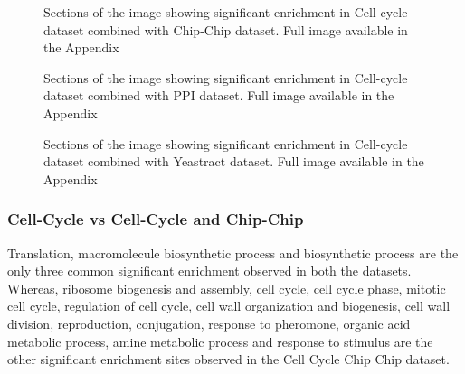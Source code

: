 \begin{figure}[p]
\centering
{}
\label{fig:ccycle_chip_enrich}
\caption{Sections of the image showing significant enrichment in Cell-cycle dataset combined with Chip-Chip dataset. Full image available in the Appendix}
\end{figure}

\begin{figure}[p]
\centering
{}
\label{fig:ccycle_ppi_enrich}
\caption{Sections of the image showing significant enrichment in Cell-cycle dataset combined with PPI dataset. Full image available in the Appendix}
\end{figure}

\begin{figure}[p]
\centering
{}
\label{fig:ccycle_yt_enrich}
\caption{Sections of the image showing significant enrichment in Cell-cycle dataset combined with Yeastract dataset. Full image available in the Appendix}
\end{figure}



\subsubsection{Cell-Cycle vs Cell-Cycle and Chip-Chip}
Translation, macromolecule biosynthetic process and biosynthetic process are the only three common significant enrichment observed 
in both the datasets. Whereas, ribosome biogenesis and assembly, cell cycle, cell cycle phase, mitotic cell cycle, regulation of 
cell cycle, cell wall organization and biogenesis, cell wall division, reproduction, conjugation, response to pheromone, organic 
acid metabolic process, amine metabolic process and response to stimulus are the other significant enrichment 
sites observed in the Cell Cycle Chip Chip dataset.

